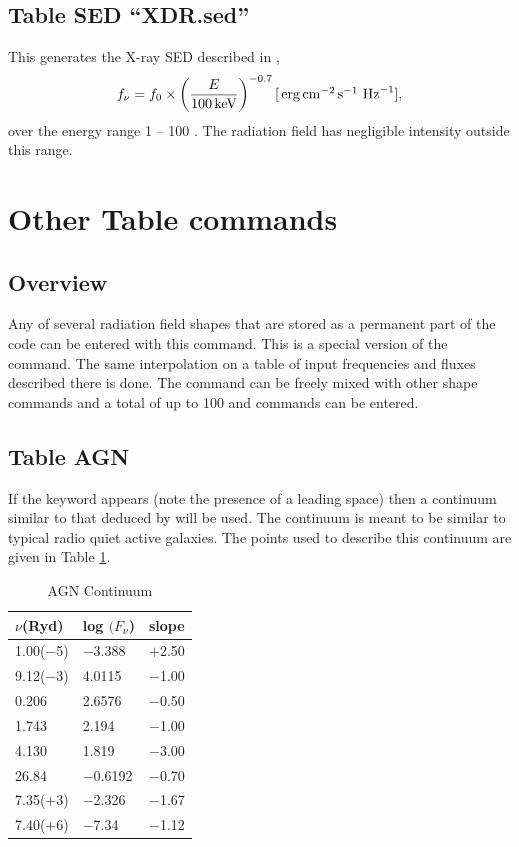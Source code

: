 \subsection{Table SED ``XDR.sed''}

This generates the X-ray SED described in 
\citet{Maloney1996},
\begin{equation}
f_{\nu}  = f_0 \times
\left( {\frac{{E }}{{100 {\rm\thinspace keV}}}} \right)^{-0.7} 
[\mbox{${\rm\thinspace erg}{\rm\thinspace cm}^{-2}{\rm\thinspace s}^{-1}\,$} {\rm\thinspace Hz}^{-1}] ,
\end{equation}
over the energy range 1 -- 100 \keV .
The radiation field has negligible intensity outside this range.

\section{Other Table commands}

\subsection{Overview}

Any of several radiation field shapes that are stored as a permanent part
of the code can be entered with this command.
This is a special version of
the  command.
The same interpolation
on a table of input frequencies and fluxes described there is done.
The  command can be freely mixed with other
shape commands and a total
of up to 100  and  commands
can be entered.

\subsection{Table AGN }
\noindent If the keyword  appears
(note the presence of a leading space) then
a continuum similar to that deduced by \citet{Mathews1987} will be
used.  The continuum is meant to be similar to typical radio quiet active
galaxies.
The points used to describe this continuum are given in
Table \ref{tab:AGNcontinuum}.

\begin{table}
\centering
\caption{AGN Continuum}
\begin{tabular}{lll}\hline
\label{tab:AGNcontinuum}
$\nu$(Ryd)& log $(F_\nu$)& slope\\
\hline
1.00($-$5)&$-$3.388& $+$2.50\\
9.12($-$3)&4.0115& $-$1.00\\
0.206& 2.6576& $-$0.50\\
1.743& 2.194& $-$1.00\\
4.130& 1.819& $-$3.00\\
26.84& $-$0.6192& $-$0.70\\
7.35($+$3)& $-$2.326& $-$1.67\\
7.40($+$6)& $-$7.34& $-$1.12\\
\hline
\end{tabular}
\end{table}

